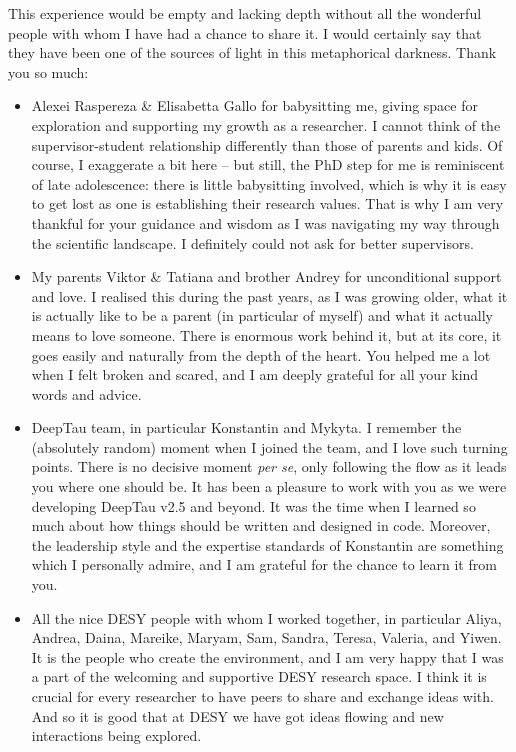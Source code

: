 This experience would be empty and lacking depth without all the wonderful people with whom I have had a chance to share it. I would certainly say that they have been one of the sources of light in this metaphorical darkness. Thank you so much:
\begin{itemize}
	\item Alexei Raspereza \& Elisabetta Gallo for babysitting me, giving space for exploration and supporting my growth as a researcher. I cannot think of the supervisor-student relationship differently than those of parents and kids. Of course, I exaggerate a bit here -- but still, the PhD step for me is reminiscent of late adolescence: there is little babysitting involved, which is why it is easy to get lost as one is establishing their research values. That is why I am very thankful for your guidance and wisdom as I was navigating my way through the scientific landscape. I definitely could not ask for better supervisors.
	
	\item My parents Viktor \& Tatiana and brother Andrey for unconditional support and love. I realised this during the past years, as I was growing older, what it is actually like to be a parent (in particular of myself) and what it actually means to love someone. There is enormous work behind it, but at its core, it goes easily and naturally from the depth of the heart. You helped me a lot when I felt broken and scared, and I am deeply grateful for all your kind words and advice.
	
	\item DeepTau team, in particular Konstantin and Mykyta. I remember the (absolutely random) moment when I joined the team, and I love such turning points. There is no decisive moment \textit{per se}, only following the flow as it leads you where one should be. It has been a pleasure to work with you as we were developing DeepTau v2.5 and beyond. It was the time when I learned so much about how things should be written and designed in code. Moreover, the leadership style and the expertise standards of Konstantin are something which I personally admire, and I am grateful for the chance to learn it from you.
	
	\item All the nice DESY people with whom I worked together, in particular Aliya, Andrea, Daina, Mareike, Maryam, Sam, Sandra, Teresa, Valeria, and Yiwen. It is the people who create the environment, and I am very happy that I was a part of the welcoming and supportive DESY research space. I think it is crucial for every researcher to have peers to share and exchange ideas with. And so it is good that at DESY we have got ideas flowing and new interactions being explored.
	

\end{itemize}
